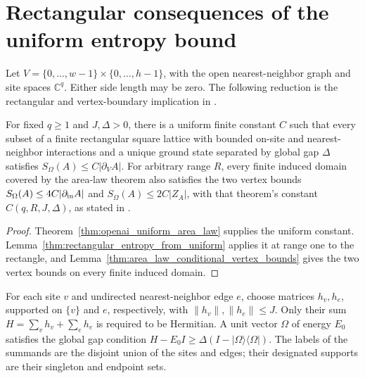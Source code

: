 \section{Rectangular consequences of the uniform entropy bound}
\label{sec:rectangular_specialization}

Let $V=\{0,\ldots,w-1\}\times\{0,\ldots,h-1\}$, with the open
nearest-neighbor graph and site spaces $\mathbb C^q$.
Either side length may be zero. The following reduction is the
rectangular and vertex-boundary implication in
\cite[Corollary~1.2]{OpenAI2026AreaLaw}.

\begin{corollary}
    \label{cor:rectangles}
    \leanok
    For fixed $q\ge1$ and $J,\Delta>0$, there is a uniform finite constant
    $C$ such that every subset of a finite rectangular square lattice with
    bounded on-site and nearest-neighbor interactions and a unique ground
    state separated by global gap $\Delta$ satisfies
    $S_\Omega(A)\le C|\partial_V A|$.
    For arbitrary range $R$, every finite induced domain covered by the
    area-law theorem also satisfies the two vertex bounds
    $S_\Omega(A)\le4C|\partial_{\rm in}A|$ and
    $S_\Omega(A)\le2C|Z_A|$, with that theorem's constant $C(q,R,J,\Delta)$,
    as stated in \cite[Corollary~1.2]{OpenAI2026AreaLaw}.
\end{corollary}
\begin{proof}
    \leanok
    Theorem~\ref{thm:openai_uniform_area_law} supplies the uniform constant.
    Lemma~\ref{thm:rectangular_entropy_from_uniform} applies it at range
    one to the rectangle, and
    Lemma~\ref{thm:area_law_conditional_vertex_bounds} gives the two vertex
    bounds on every finite induced domain.
\end{proof}

\begin{definition}
    \label{def:rectangular_hamiltonian}
    \leanok
    For each site $v$ and undirected nearest-neighbor edge $e$, choose matrices
    $h_v,h_e$, supported on $\{v\}$ and $e$, respectively, with
    $\|h_v\|,\|h_e\|\le J$. Only their sum
    $H=\sum_v h_v+\sum_e h_e$ is required to be Hermitian.
    A unit vector $\Omega$ of energy $E_0$ satisfies the global gap condition
    $H-E_0 I\ge\Delta(I-|\Omega\rangle\langle\Omega|)$.
    The labels of the summands are the disjoint union of the sites and edges;
    their designated supports are their singleton and endpoint sets.
\end{definition}

